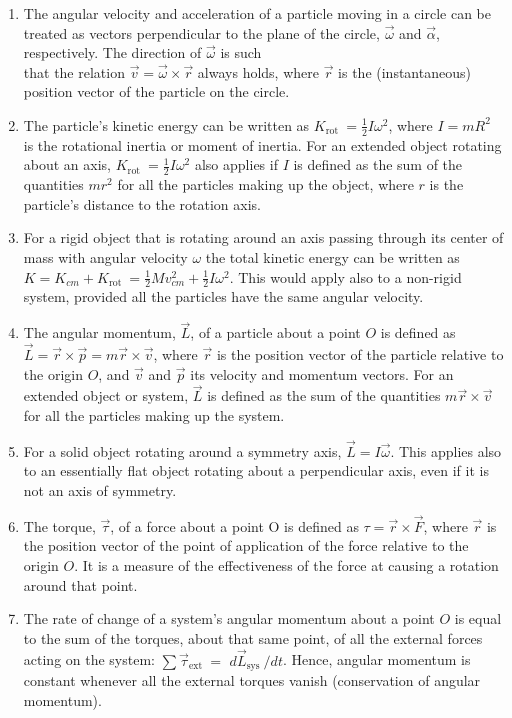 \documentclass[10pt]{article}
\begin{document}
\begin{enumerate}
  \item The angular velocity and acceleration of a particle moving in a circle can be treated as vectors perpendicular to the plane of the circle, $\vec{\omega}$ and $\vec{\alpha}$, respectively. The direction of $\vec{\omega}$ is such\\
that the relation $\vec{v}=\vec{\omega} \times \vec{r}$ always holds, where $\vec{r}$ is the (instantaneous) position vector of the particle on the circle.
  \item The particle's kinetic energy can be written as $K_{\text {rot }}=\frac{1}{2} I \omega^{2}$, where $I=m R^{2}$ is the rotational inertia or moment of inertia. For an extended object rotating about an axis, $K_{\text {rot }}=\frac{1}{2} I \omega^{2}$ also applies if $I$ is defined as the sum of the quantities $m r^{2}$ for all the particles making up the object, where $r$ is the particle's distance to the rotation axis.
  \item For a rigid object that is rotating around an axis passing through its center of mass with angular velocity $\omega$ the total kinetic energy can be written as $K=K_{c m}+K_{\text {rot }}=\frac{1}{2} M v_{c m}^{2}+\frac{1}{2} I \omega^{2}$. This would apply also to a non-rigid system, provided all the particles have the same angular velocity.
  \item The angular momentum, $\vec{L}$, of a particle about a point $O$ is defined as $\vec{L}=\vec{r} \times \vec{p}=m \vec{r} \times \vec{v}$, where $\vec{r}$ is the position vector of the particle relative to the origin $O$, and $\vec{v}$ and $\vec{p}$ its velocity and momentum vectors. For an extended object or system, $\vec{L}$ is defined as the sum of the quantities $m \vec{r} \times \vec{v}$ for all the particles making up the system.
  \item For a solid object rotating around a symmetry axis, $\vec{L}=I \vec{\omega}$. This applies also to an essentially flat object rotating about a perpendicular axis, even if it is not an axis of symmetry.
  \item The torque, $\vec{\tau}$, of a force about a point O is defined as $\tau=\vec{r} \times \vec{F}$, where $\vec{r}$ is the position vector of the point of application of the force relative to the origin $O$. It is a measure of the effectiveness of the force at causing a rotation around that point.
  \item The rate of change of a system's angular momentum about a point $O$ is equal to the sum of the torques, about that same point, of all the external forces acting on the system: $\sum \vec{\tau}_{\text {ext }}=$ $d \vec{L}_{\text {sys }} / d t$. Hence, angular momentum is constant whenever all the external torques vanish (conservation of angular momentum).

\end{enumerate}
\end{document}
